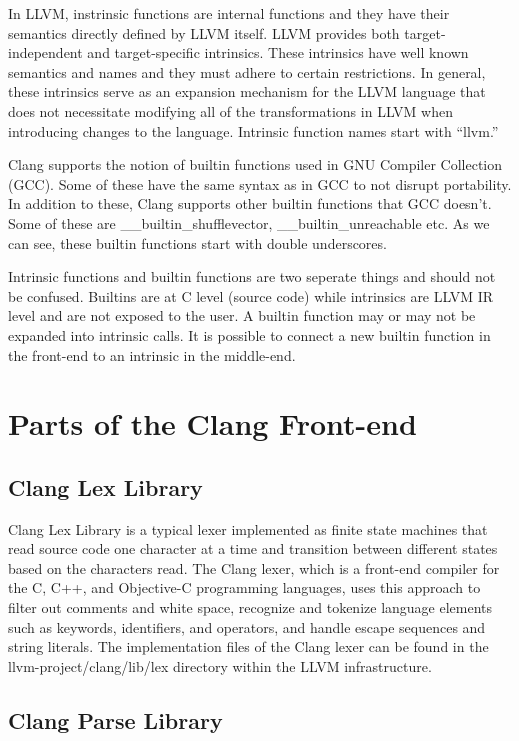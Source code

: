 In LLVM, instrinsic functions are internal functions and they have their semantics directly defined by LLVM itself. LLVM provides both target-independent and target-specific intrinsics. \cite{llvmdevmeeting} These intrinsics have well known semantics and names and they must adhere to certain restrictions. In general, these intrinsics serve as an expansion mechanism for the LLVM language that does not necessitate modifying all of the transformations in LLVM when introducing changes to the language. Intrinsic function names start with “llvm.” \cite{googlesiteintrinsic}

Clang supports the notion of builtin functions used in GNU Compiler Collection (GCC). Some of these have the same syntax as in GCC to not disrupt portability. In addition to these, Clang supports other builtin functions that GCC doesn’t. Some of these are \_\_builtin\_shufflevector, \_\_builtin\_unreachable etc. As we can see, these builtin functions start with double underscores. 

Intrinsic functions and builtin functions are two seperate things and should not be confused. Builtins are at C level (source code) while intrinsics are LLVM IR level and are not exposed to the user. A builtin function may or may not be expanded into intrinsic calls. It is possible to connect a new builtin function in the front-end to an intrinsic in the middle-end.

\section{Parts of the Clang Front-end}

\subsection{Clang Lex Library}
Clang Lex Library is a typical lexer implemented as finite state machines that read source code one character at a time and transition between different states based on the characters read. The Clang lexer, which is a front-end compiler for the C, C++, and Objective-C programming languages, uses this approach to filter out comments and white space, recognize and tokenize language elements such as keywords, identifiers, and operators, and handle escape sequences and string literals. The implementation files of the Clang lexer can be found in the llvm-project/clang/lib/lex directory within the LLVM infrastructure.
	

\subsection{Clang Parse Library}

